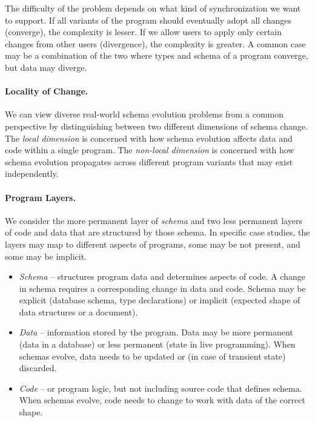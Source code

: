 \documentclass[english,crc]{programming}
\begin{document}
The difficulty of the problem depends on what kind of synchronization we want to support.
If all variants of the program should eventually adopt all changes (converge), the complexity
is lesser. If we allow users to apply only certain changes from other users (divergence), the
complexity is greater. A common case may be a combination of the two where types and schema
of a program converge, but data may diverge.


\vspace{-0.4em}
\paragraph{Locality of Change.}
We can view diverse real-world schema evolution problems from a common perspective by distinguishing between two different dimensions of schema change.
The \emph{local dimension} is concerned with how schema evolution affects data and code within
a single program. The \emph{non-local dimension} is concerned with how schema evolution
propagates across different program variants that may exist independently.

\vspace{-0.4em}
\paragraph{Program Layers.}
We consider the more permanent layer of \emph{schema} and two less permanent layers of code and
data that are structured by those schema. In specific case studies, the layers may map to
different aspects of programs, some may be not present, and some may be implicit.

\begin{itemize}
\item \emph{Schema} -- structures program data and determines aspects of code. A change in schema
  requires a corresponding change in data and code. Schema may be explicit (database schema, type declarations)
  or implicit (expected shape of data structures or a document).
\item \emph{Data} -- information stored by the program. Data may be more permanent (data in a
  database) or less permanent (state in live programming). When schemas evolve, data needs to be
  updated or (in case of transient state) discarded.
\item \emph{Code} -- or program logic, but not including source code that defines schema.
  When schemas evolve, code needs to change to work with data of the correct shape.
\end{itemize}
\end{document}
